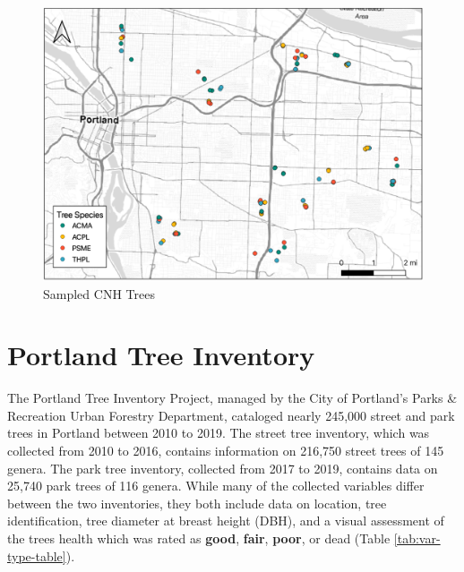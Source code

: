 \documentclass[12pt,twoside]{reedthesis}
\begin{document}
\begin{figure}[H]

{\centering \includegraphics[width=1\linewidth,]{figure/cnh_trees} 

}

\caption{Sampled CNH Trees}\label{fig:cnh-trees}
\end{figure}
\hypertarget{portland-tree-inventory}{%
\section{Portland Tree Inventory}\label{portland-tree-inventory}}

The Portland Tree Inventory Project, managed by the City of Portland's
Parks \& Recreation Urban Forestry Department, cataloged nearly 245,000
street and park trees in Portland between 2010 to 2019. The street tree
inventory, which was collected from 2010 to 2016, contains information
on 216,750 street trees of 145 genera. The park tree inventory,
collected from 2017 to 2019, contains data on 25,740 park trees of 116
genera. While many of the collected variables differ between the two
inventories, they both include data on location, tree identification,
tree diameter at breast height (DBH), and a visual assessment of the
trees health which was rated as \textbf{good}, \textbf{fair}, \textbf{poor}, or dead
(Table \ref{tab:var-type-table}).
\end{document}
